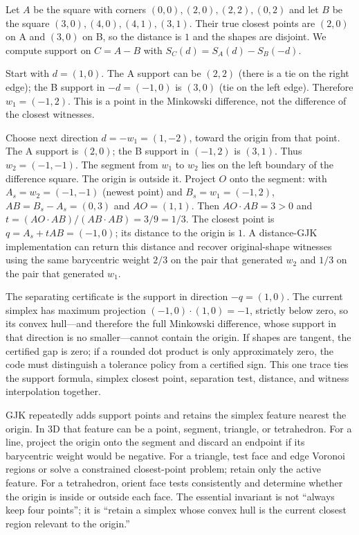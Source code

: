 Let \(A\) be the square with corners \((0,0),(2,0),(2,2),(0,2)\) and let \(B\) be the square \((3,0),(4,0),(4,1),(3,1)\). Their true closest points are \((2,0)\) on A and \((3,0)\) on B, so the distance is \(1\) and the shapes are disjoint. We compute support on \(C=A-B\) with \(S_C(d)=S_A(d)-S_B(-d)\).

Start with \(d=(1,0)\). The A support can be \((2,2)\) (there is a tie on the right edge); the B support in \(-d=(-1,0)\) is \((3,0)\) (tie on the left edge). Therefore \(w_1=(-1,2)\). This is a point in the Minkowski difference, not the difference of the closest witnesses.

Choose next direction \(d=-w_1=(1,-2)\), toward the origin from that point. The A support is \((2,0)\); the B support in \((-1,2)\) is \((3,1)\). Thus \(w_2=(-1,-1)\). The segment from \(w_1\) to \(w_2\) lies on the left boundary of the difference square. The origin is outside it. Project \(O\) onto the segment: with \(A_s=w_2=(-1,-1)\) (newest point) and \(B_s=w_1=(-1,2)\), \(AB=B_s-A_s=(0,3)\) and \(AO=(1,1)\). Then \(AO\cdot AB=3>0\) and \(t=(AO\cdot AB)/(AB\cdot AB)=3/9=1/3\). The closest point is \(q=A_s+tAB=(-1,0)\); its distance to the origin is \(1\). A distance-GJK implementation can return this distance and recover original-shape witnesses using the same barycentric weight \(2/3\) on the pair that generated \(w_2\) and \(1/3\) on the pair that generated \(w_1\).

The separating certificate is the support in direction \(-q=(1,0)\). The current simplex has maximum projection \((-1,0)\cdot(1,0)=-1\), strictly below zero, so its convex hull---and therefore the full Minkowski difference, whose support in that direction is no smaller---cannot contain the origin. If shapes are tangent, the certified gap is zero; if a rounded dot product is only approximately zero, the code must distinguish a tolerance policy from a certified sign. This one trace ties the support formula, simplex closest point, separation test, distance, and witness interpolation together.

GJK repeatedly adds support points and retains the simplex feature nearest the origin. In 3D that feature can be a point, segment, triangle, or tetrahedron. For a line, project the origin onto the segment and discard an endpoint if its barycentric weight would be negative. For a triangle, test face and edge Voronoi regions or solve a constrained closest-point problem; retain only the active feature. For a tetrahedron, orient face tests consistently and determine whether the origin is inside or outside each face. The essential invariant is not ``always keep four points''; it is ``retain a simplex whose convex hull is the current closest region relevant to the origin.''

